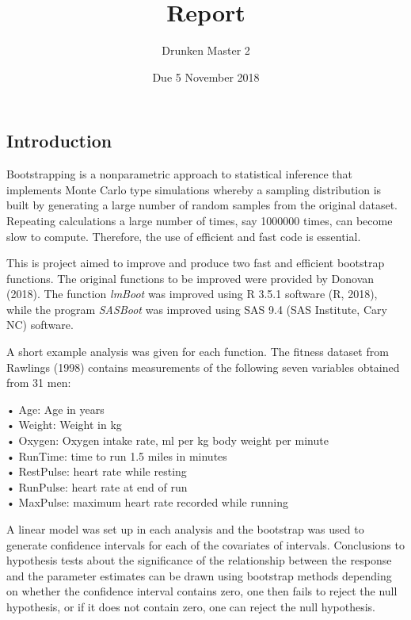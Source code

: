 \documentclass[]{article}
\title{Report}
\author{Drunken Master 2}
\date{Due 5 November 2018}
\begin{document}
\maketitle

{
\setcounter{tocdepth}{3}
\tableofcontents
}
\pagebreak

\subsection{Introduction}\label{introduction}

Bootstrapping is a nonparametric approach to statistical inference that
implements Monte Carlo type simulations whereby a sampling distribution
is built by generating a large number of random samples from the
original dataset. Repeating calculations a large number of times, say
1000000 times, can become slow to compute. Therefore, the use of
efficient and fast code is essential.

This is project aimed to improve and produce two fast and efficient
bootstrap functions. The original functions to be improved were provided
by Donovan (2018). The function \emph{lmBoot} was improved using R 3.5.1
software (R, 2018), while the program \emph{SASBoot} was improved using
SAS 9.4 (SAS Institute, Cary NC) software.

A short example analysis was given for each function. The fitness
dataset from Rawlings (1998) contains measurements of the following
seven variables obtained from 31 men:

• Age: Age in years\\
• Weight: Weight in kg\\
• Oxygen: Oxygen intake rate, ml per kg body weight per minute\\
• RunTime: time to run 1.5 miles in minutes\\
• RestPulse: heart rate while resting\\
• RunPulse: heart rate at end of run\\
• MaxPulse: maximum heart rate recorded while running

A linear model was set up in each analysis and the bootstrap was used to
generate confidence intervals for each of the covariates of intervals.
Conclusions to hypothesis tests about the significance of the
relationship between the response and the parameter estimates can be
drawn using bootstrap methods depending on whether the confidence
interval contains zero, one then fails to reject the null hypothesis, or
if it does not contain zero, one can reject the null hypothesis.
\end{document}
